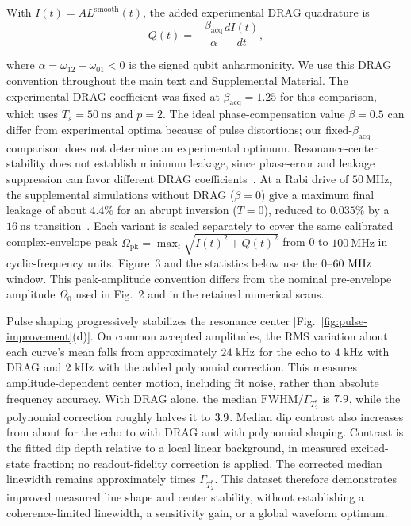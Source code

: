 \begin{samepage}
With $I(t)=A L^{\mathrm{smooth}}(t)$, the added experimental DRAG
quadrature is
\begin{equation}
    Q(t)=-\frac{\beta_{\mathrm{acq}}}{\alpha}\frac{dI(t)}{dt},
    \label{eq:drag-quadrature}
\end{equation}
\end{samepage}
where $\alpha=\omega_{12}-\omega_{01}<0$ is the signed qubit anharmonicity.
We use this DRAG convention throughout the main text and Supplemental
Material. The experimental DRAG coefficient was fixed at
$\beta_{\mathrm{acq}}=1.25$ for this comparison, which uses
$T_s=50~\mathrm{ns}$ and $p=2$.
The ideal phase-compensation value $\beta=0.5$ can differ from experimental
optima because of pulse distortions; our fixed-$\beta_{\mathrm{acq}}$
comparison does not determine an experimental optimum.
Resonance-center stability does not establish minimum leakage, since
phase-error and leakage suppression can favor different DRAG
coefficients~\cite{chen_leakage_2016}.
At a Rabi drive of $50~\mathrm{MHz}$, the supplemental simulations without
DRAG ($\beta=0$) give a maximum final leakage of about $4.4\%$ for an
abrupt inversion ($T=0$), reduced to $0.035\%$ by a $16~\mathrm{ns}$
transition~\cite{SupplementalMaterial}.
Each variant is scaled separately to cover the same calibrated
complex-envelope peak $\Omega_{\mathrm{pk}}=\max_t\sqrt{I(t)^2+Q(t)^2}$
from 0 to $100~\mathrm{MHz}$ in cyclic-frequency units. Figure~3 and the
statistics below use the $0$--$60~\mathrm{MHz}$ window.
This peak-amplitude convention differs
from the nominal pre-envelope amplitude $\Omega_0$ used in Fig.~2
and in the retained numerical scans.

Pulse shaping progressively stabilizes the resonance center
[Fig.~\ref{fig:pulse-improvement}(d)]. On common accepted amplitudes, the
RMS variation about each curve's mean falls from approximately
$24~\mathrm{kHz}$ for the echo to
$4~\mathrm{kHz}$ with DRAG and
$2~\mathrm{kHz}$ with the added polynomial correction.
This measures amplitude-dependent center motion, including fit noise,
rather than absolute frequency accuracy.
With DRAG alone, the median $\mathrm{FWHM}/\Gamma_{T_2^*}$ is
$7.9$, while
the polynomial correction roughly halves it to
$3.9$. Median dip contrast also increases from
about \LatestEchoContrast{} for the echo to \LatestDragContrast{} with DRAG
and \LatestPolyContrast{} with polynomial shaping.
Contrast is the fitted dip depth relative to a local linear background,
in measured excited-state fraction; no readout-fidelity correction is applied.
The corrected median linewidth remains approximately \LatestPolyLimitRatio{}
times $\Gamma_{T_2^*}$. This dataset therefore demonstrates improved measured
line shape and center stability, without establishing a coherence-limited
linewidth, a sensitivity gain, or a global waveform optimum.

